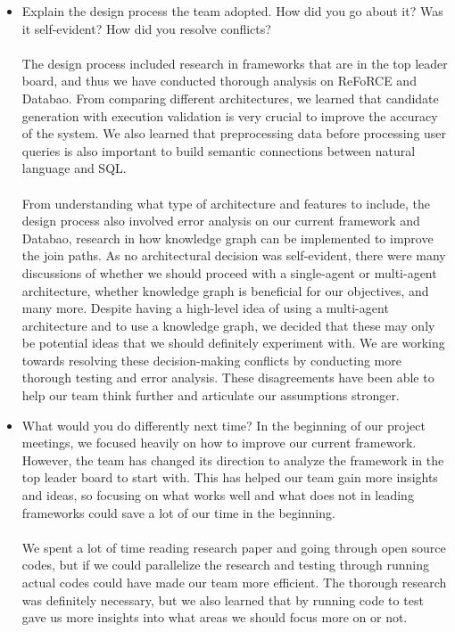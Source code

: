 \begin{itemize}
    \item Explain the design process the team adopted. How did you go about it? Was it self-evident? How did you resolve conflicts?
    \\\\
    The design process included research in frameworks that are in the top leader board, and thus we have conducted thorough analysis on ReFoRCE \cite{lei2024spider} and Databao. From comparing different architectures, we learned that candidate generation with execution validation is very crucial to improve the accuracy of the system. We also learned that preprocessing data before processing user queries is also important to build semantic connections between natural language and SQL.
\\\\
    From understanding what type of architecture and features to include, the design process also involved error analysis on our current framework and Databao, research in how knowledge graph can be implemented to improve the join paths. As no architectural decision was self-evident, there were many discussions of whether we should proceed with a single-agent or multi-agent architecture, whether knowledge graph is beneficial for our objectives, and many more. Despite having a high-level idea of using a multi-agent architecture and to use a knowledge graph, we decided that these may only be potential ideas that we should definitely experiment with. We are working towards resolving these decision-making conflicts by conducting more thorough testing and error analysis. These disagreements have been able to help our team think further and articulate our assumptions stronger.
    \item What would you do differently next time?
    In the beginning of our project meetings, we focused heavily on how to improve our current framework. However, the team has changed its direction to analyze the framework in the top leader board to start with. This has helped our team gain more insights and ideas, so focusing on what works well and what does not in leading frameworks could save a lot of our time in the beginning.
\\\\
    We spent a lot of time reading research paper and going through open source codes, but if we could parallelize the research and testing through running actual codes could have made our team more efficient. The thorough research was definitely necessary, but we also learned that by running code to test gave us more insights into what areas we should focus more on or not. 
\end{itemize}
